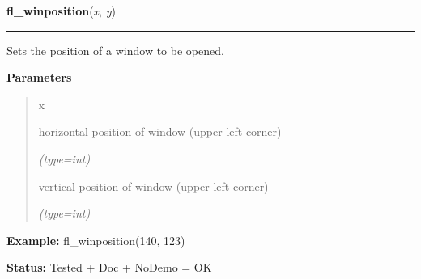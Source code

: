 \hspace{.8\funcindent}\begin{boxedminipage}{\funcwidth}

    \raggedright \textbf{fl\_winposition}(\textit{x}, \textit{y})

    \vspace{-1.5ex}

    \rule{\textwidth}{0.5\fboxrule}
\setlength{\parskip}{2ex}
    Sets the position of a window to be opened.

\setlength{\parskip}{1ex}
      \textbf{Parameters}
      \vspace{-1ex}

      \begin{quote}
        \begin{Ventry}{x}

          \item[x]

          horizontal position of window (upper-left corner)

            {\it (type=int)}

          \item[y]

          vertical position of window (upper-left corner)

            {\it (type=int)}

        \end{Ventry}

      \end{quote}

\textbf{Example:} fl\_winposition(140, 123)



\textbf{Status:} Tested + Doc + NoDemo = OK



    \end{boxedminipage}

    \label{xformslib:flxbasic:fl_winposition}

    \vspace{0.5ex}

